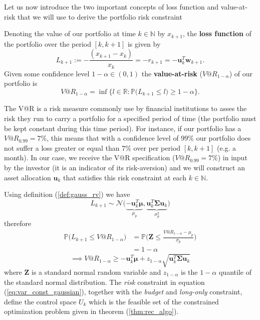 Let us now introduce the two important concepts of loss function and value-at-risk that we will use to derive the portfolio risk constraint
\begin{definition}\label{def:loss_function}
	Denoting the value of our portfolio at time $k \in \mathbb{N}$ by $x_{k+1}$, the \textbf{loss function} of the portfolio over the period $[k,k+1]$ is given by \[ L_{k+1}:= -\frac{(x_{k+1}-x_k)}{x_k}= -r_{k+1} = -\bm{u}_k^T \bm{w}_{k+1}.  \]
	Given some confidence level $1-\alpha \in (0,1) $ the \textbf{value-at-risk} ($V@R_{1-\alpha}$) of our portfolio is \[ V@R_{1-\alpha} = \inf\{l\in \mathbb{R} : \mathbb{P}\big(L_{k+1} \leq l \big) \geq 1-\alpha \}. \]
\end{definition}

The V@R is a risk measure commonly use by financial institutions to asses the risk they run to carry a portfolio for a specified period of time (the portfolio must be kept constant during this time period). For instance, if our portfolio has a $V@R_{0.99} = 7\%$, this means that with a confidence level of $99\%$ our portfolio does not suffer a loss greater or equal than $7\%$ over per period $[k,k+1]$ (e.g. a month). In our case, we receive the V@R specification ($V@R_{0.99} = 7\%$) in input by the investor (it is an indicator of its risk-aversion) and we will construct an asset allocation $\bm{u}_k$ that satisfies this risk constraint at each $k \in \mathbb{N}$.

Using definition (\ref{def:gauss_rv}) we have \[ L_{k+1} \sim \mathcal{N}\big(\underbrace{-\bm{u}_k^T \bm{\mu}}_{\mu_p},\underbrace{\bm{u}_k^T \bm{\Sigma} \bm{u}_k}_{\sigma^2_p} \big)\] therefore
\begin{align*}
\mathbb{P}\big(L_{k+1} \leq V@R_{1-\alpha}\big) 
& = \mathbb{P}\Big(\bm{Z} \leq \frac{V@R_{1-\alpha} - \mu_p}{\sigma_p}  \Big) \\
& = 1 - \alpha
\end{align*}
\begin{equation}\label{eq:var_const_gaussian}
\implies \boxed{V@R_{1-\alpha} \geq -\bm{u}_k^T\bm{\mu} + z_{1-\alpha} \sqrt{\bm{u}_k^T \bm{\Sigma} \bm{u}_k}}
\end{equation}
where $\bm{Z}$ is a standard normal random variable and $z_{1-\alpha}$ is the $1-\alpha$ quantile of the standard normal distribution. The \textit{risk} constraint in equation (\ref{eq:var_const_gaussian}), together with the \textit{budget} and \textit{long-only} constraint, define the control space $U_k$ which is the feasible set of the constrained optimization problem given in theorem (\ref{thm:rec_algo}).
